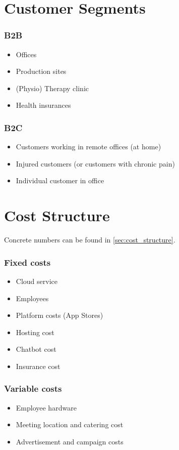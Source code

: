 \section{Customer Segments}
\subsubsection*{B2B}
\begin{itemize}
    \item Offices
    \item Production sites
    \item (Physio) Therapy clinic
    \item Health insurances
\end{itemize}

\subsubsection*{B2C}
\begin{itemize}
    \item Customers working in remote offices (at home)
    \item Injured customers (or customers with chronic pain)
    \item Individual customer in office
\end{itemize}

\section{Cost Structure}
Concrete numbers can be found in \ref{sec:cost_structure}.
\subsubsection*{Fixed costs}
\begin{itemize}
    \item Cloud service
    \item Employees
    \item Platform costs (App Stores)
    \item Hosting cost
    \item Chatbot cost
    \item Insurance cost
\end{itemize}

\subsubsection*{Variable costs}
\begin{itemize}
    \item Employee hardware
    \item Meeting location and catering cost
    \item Advertisement and campaign costs
\end{itemize}

